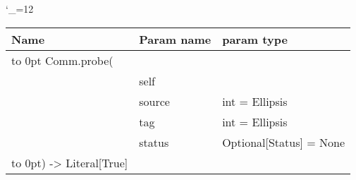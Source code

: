 \begingroup \catcode`\_=12 \tt
\begin{tabular}{lll}
\toprule
\textrm{Name}&\textrm{Param name}&\textrm{param type}\\
\midrule
\hbox to 0pt {Comm.probe(\hss}\\
& self\\
& source & int = Ellipsis\\
& tag & int = Ellipsis\\
& status & Optional[Status] = None\\
\hbox to 0pt{) -> Literal[True]\hss}\\
\bottomrule
\end{tabular}
\endgroup
